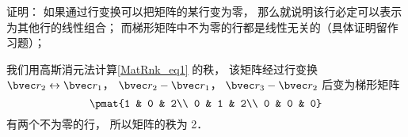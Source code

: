 证明： 如果通过行变换可以把矩阵的某行变为零， 那么就说明该行必定可以表示为其他行的线性组合； 而梯形矩阵中不为零的行都是线性无关的（具体证明留作习题）；

\begin{example}{}
我们用高斯消元法计算\autoref{MatRnk_eq1} 的秩， 该矩阵经过行变换 $\bvec r_2 \leftrightarrow \bvec r_1$， $\bvec r_2 - \bvec r_1$， $\bvec r_3 - \bvec r_2$ 后变为梯形矩阵
\begin{equation}
\pmat{1 & 0 & 2\\ 0 & 1 & 2\\ 0 & 0 & 0}
\end{equation}
有两个不为零的行， 所以矩阵的秩为 2．
\end{example}
